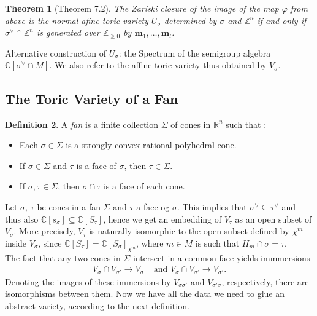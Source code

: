 \documentclass[a4paper]{article}
\newtheorem{theorem}{Theorem}[section]
\theoremstyle{definition}
\newtheorem{definition}[theorem]{Definition}
\begin{document}
  \begin{theorem}[Theorem 7.2]
    The Zariski closure of the image of the map $\varphi $ from above is the normal afine toric variety $U_{\sigma}$ determined by $\sigma $ and $\mathbb{Z}^{n}$ if and only if $\sigma^{\vee} \cap \mathbb{Z}^{n}$ is generated over $\mathbb{Z}_{\geq 0}$ by $\boldsymbol{m} _{1}, \dots, \boldsymbol{m} _{l}$.
  \end{theorem}

  Alternative construction of $U_{\sigma}$: the Spectrum of the semigroup algebra $\mathbb{C} \left[ \sigma^{\vee} \cap M \right]$. We also refer to the affine toric variety thus obtained by $V_{\sigma}$.

  \subsection{The Toric Variety of a Fan}
  \begin{definition}
    A \emph{fan} is a finite collection $\Sigma$ of cones in $\mathbb{R}^{n}$ such that :
    \begin{itemize}
      \item Each $\sigma \in \Sigma$ is a strongly convex rational polyhedral cone.
      \item If $\sigma \in \Sigma$ and $\tau$ is a face of $\sigma$, then $\tau \in \Sigma$.
      \item If $\sigma, \tau \in \Sigma$, then $\sigma \cap \tau$ is a face of each cone.
    \end{itemize}
  \end{definition}
  Let $\sigma$, $\tau$ be cones in a fan $\Sigma$ and $\tau$ a face og $\sigma$. This implies that $\sigma ^{\vee}  \subseteq \tau ^{\vee} $ and thus also $\mathbb{C} \left[ s_{\sigma} \right] \subseteq \mathbb{C} \left[ S_{\tau} \right]$, hence we get an embedding of $V_{\tau}$ as an open subset of $V_{\sigma}$. More precisely, $V_{\tau}$ is naturally isomorphic to the open subset defined by $\chi^{m}$inside $V_{\sigma}$, since $\mathbb{C} \left[ S_{\tau} \right] = \mathbb{C} \left[ S_{\sigma} \right]_{\chi^{m}}$, where $m \in M$ is such that $H_{m} \cap \sigma = \tau$.\\
  The fact that any two cones in $\Sigma$ intersect in a common face yields immmersions
  \begin{align*}
    V_{\sigma}\cap V_{\sigma'} \rightarrow  V_{\sigma}  & \text{ and } V_{\sigma}\cap V_{\sigma'} \rightarrow  V_{\sigma'}.
  \end{align*}
  Denoting the images of these immersions by $V_{\sigma \sigma'}$ and $V_{\sigma' \sigma}$, respectively, there are isomorphisms between them. Now we have all the data we need to glue an abstract variety, according to the next definition.
\end{document}
